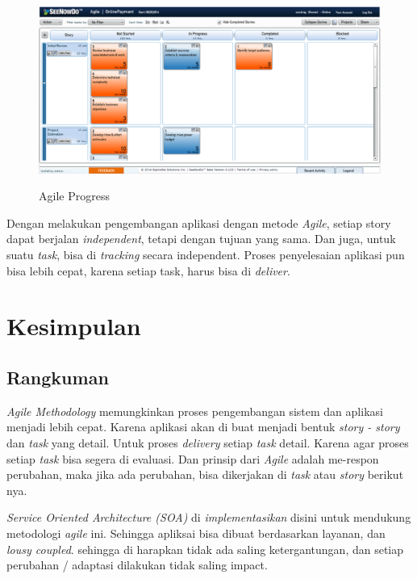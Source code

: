 \documentclass[9pt,twocolumn,twoside]{Gunadarma}
\begin{document}
\begin{figure}[htbp]
\begin{center}
\includegraphics[width=1\columnwidth]{Agile-3.eps} \label{fig:3-noFCase1}
\end{center}
\caption{Agile Progress}
\end{figure}

Dengan melakukan pengembangan aplikasi dengan metode \textit{Agile}, setiap story dapat berjalan \textit{independent}, tetapi dengan tujuan yang sama. Dan juga, untuk suatu \textit{task}, bisa di \textit{tracking} secara independent. Proses penyelesaian aplikasi pun bisa lebih cepat, karena setiap task, harus bisa di \textit{deliver}. 

\section{Kesimpulan}
\subsection{Rangkuman}
\textit{Agile Methodology} memungkinkan proses pengembangan sistem dan aplikasi menjadi lebih cepat. Karena aplikasi akan di buat menjadi bentuk \textit{story - story} dan \textit{task} yang detail. Untuk proses \textit{delivery} setiap \textit{task} detail. Karena agar proses setiap \textit{task} bisa segera di evaluasi. Dan prinsip dari \textit{Agile} adalah me-respon perubahan, maka jika ada perubahan, bisa dikerjakan di \textit{task} atau \textit{story }berikut nya.

\textit{Service Oriented Architecture (SOA)} di \textit{implementasikan} disini untuk mendukung metodologi \textit{agile} ini. Sehingga apliksai bisa dibuat berdasarkan layanan, dan \textit{lousy coupled}. sehingga di harapkan tidak ada saling ketergantungan, dan setiap perubahan / adaptasi dilakukan tidak saling impact. 
\end{document}
